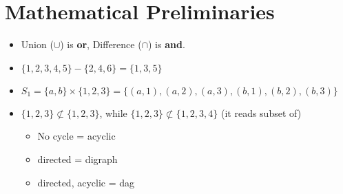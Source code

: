 \documentclass[12pt]{article}
\begin{document}
\section{Mathematical Preliminaries}

\begin{itemize}
    \item Union ($\cup$) is \textbf{or}, Difference ($\cap$) is \textbf{and}.
    \item $\{ 1, 2, 3, 4, 5\} - \{ 2, 4, 6 \} = \{ 1, 3, 5 \}$
    \item $S_1 = \{ a, b \} \times \{ 1, 2, 3 \} = \{ (a, 1), (a, 2), (a, 3), (b, 1), (b, 2), (b, 3) \}$
    \item $\{ 1, 2, 3 \} \not\subset \{ 1, 2, 3 \}$, while $\{ 1, 2, 3 \} \not\subset \{ 1, 2, 3, 4 \}$ (it reads subset of)

    \begin{itemize}
        \item No cycle = acyclic
        \item directed = digraph
        \item directed, acyclic = dag
    \end{itemize}
\end{itemize}
\end{document}
